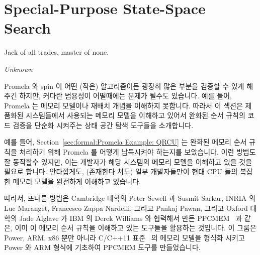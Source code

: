 
\section{Special-Purpose State-Space Search}
\label{sec:formal:Special-Purpose State-Space Search}
%
\epigraph{Jack of all trades, master of none.}{\emph{Unknown}}

Promela 와 spin 이 어떤 (작은) 알고리즘이든 굉장히 많은 부분을 검증할 수 있게
해주긴 하지만, 커다란 범용성이 어떨때에는 문제가 될수도 있습니다.
예를 들어, Promela 는 메모리 모델이나 재배치 개념을 이해하지 못합니다.
따라서 이 섹션은 제품화된 시스템들에서 사용되는 메모리 모델을 이해하고 있어서
완화된 순서 규칙의 코드 검증을 단순화 시켜주는 상태 공간 탐색 도구들을
소개합니다.

예를 들어,
Section~\ref{sec:formal:Promela Example: QRCU}
는 완화된 메모리 순서 규칙을 처리하기 위해 Promela 를 어떻게 납득시켜야
하는지를 보았습니다.
이런 방법도 잘 동작할수 있지만, 이는 개발자가 해당 시스템의 메모리 모델을
이해하고 있을 것을 필요로 합니다.
안타깝게도, (존재한다 쳐도) 일부 개발자들만이 현대 CPU 들의 복잡한 메모리
모델을 완전하게 이해하고 있습니다.
\iffalse

Although Promela and spin allow you to verify pretty much any (smallish)
algorithm, their very generality can sometimes be a curse.
For example, Promela does not understand memory models or any sort
of reordering semantics.
This section therefore describes some state-space search tools that
understand memory models used by production systems, greatly simplifying the
verification of weakly ordered code.

For example,
Section~\ref{sec:formal:Promela Example: QRCU}
showed how to convince Promela to account for weak memory ordering.
Although this approach can work well, it requires that the developer
fully understand the system's memory model.
Unfortunately, few (if any) developers fully understand the complex
memory models of modern CPUs.
\fi

따라서, 또다른 방법은
Cambridge 대학의 Peter Sewell 과 Susmit Sarkar, INRIA 의 Luc Maranget,
Francesco Zappa Nardelli, 그리고 Pankaj Pawan, 그리고 Oxford 대학의 Jade
Alglave 가 IBM 의 Derek Williams 와 협력해서 만든
PPCMEM~\cite{JadeAlglave2011ppcmem} 과 같은, 이미 이 메모리 순서 규칙을
이해하고 있는 도구들을 활용하는 것입니다.
이 그룹은 Power, ARM, x86 뿐만 아니라 C/C++11 표준~\cite{PeteBecker2011N3242}
의 메모리 모델을 형식화 시키고 Power 와 ARM 형식에 기초하여 PPCMEM 도구를
만들었습니다.
\iffalse


